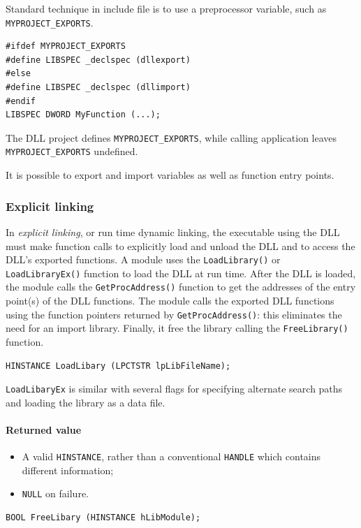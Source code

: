 Standard technique in include file is to use a preprocessor variable, such as \texttt{MYPROJECT\_EXPORTS}.
\begin{verbatim}
#ifdef MYPROJECT_EXPORTS
#define LIBSPEC _declspec (dllexport)
#else
#define LIBSPEC _declspec (dllimport)
#endif
LIBSPEC DWORD MyFunction (...);
\end{verbatim}
The DLL project defines \texttt{MYPROJECT\_EXPORTS}, while calling application leaves \texttt{MYPROJECT\_EXPORTS} undefined.

It is possible to export and import variables as well as function entry points. 

\subsubsection{Explicit linking}
In \emph{explicit linking}, or run time dynamic linking, the executable using the DLL must make function calls to explicitly load and unload the DLL and to access the DLL’s exported functions. A module uses the \texttt{LoadLibrary()} or \texttt{LoadLibraryEx()} function to load the DLL at run time. After the DLL is loaded, the module calls the \texttt{GetProcAddress()} function to get the addresses of the entry point(s) of the DLL functions. The module calls the exported DLL functions using the function pointers returned by \texttt{GetProcAddress()}: this eliminates the need for an import library. Finally, it free the library calling the \texttt{FreeLibrary()} function.

\begin{verbatim}
HINSTANCE LoadLibary (LPCTSTR lpLibFileName);
\end{verbatim}
\texttt{LoadLibaryEx} is similar with several flags for specifying alternate search paths and loading the library as a data file.

\paragraph{Returned value}
\begin{itemize}
\item A valid \texttt{HINSTANCE}, rather than a conventional \texttt{HANDLE} which contains different information;
\item \texttt{NULL} on failure.
\end{itemize}

\begin{verbatim}
BOOL FreeLibary (HINSTANCE hLibModule);
\end{verbatim}

